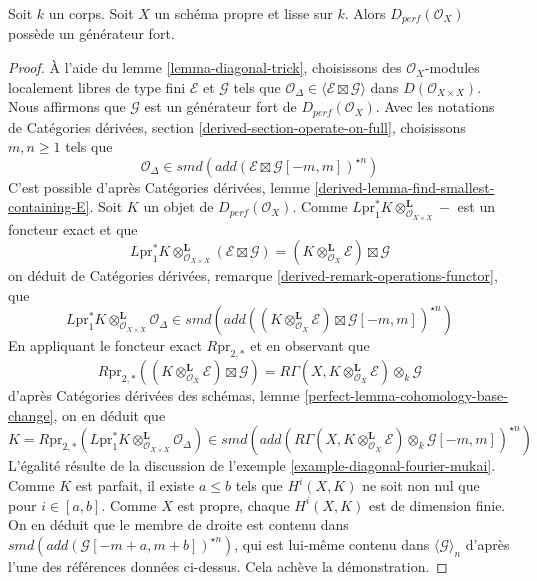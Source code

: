 \begin{lemma}
\label{lemma-smooth-proper-strong-generator}
Soit $k$ un corps. Soit $X$ un schéma propre et lisse sur $k$.
Alors $D_{perf}(\mathcal{O}_X)$
possède un générateur fort.
\end{lemma}

\begin{proof}
À l'aide du lemme \ref{lemma-diagonal-trick}, choisissons des
$\mathcal{O}_X$-modules localement libres de type fini $\mathcal{E}$ et $\mathcal{G}$ tels que
$\mathcal{O}_\Delta \in \langle \mathcal{E} \boxtimes \mathcal{G} \rangle$
dans $D(\mathcal{O}_{X \times X})$. Nous affirmons que $\mathcal{G}$
est un générateur fort de $D_{perf}(\mathcal{O}_X)$. Avec les notations de
Catégories dérivées, section \ref{derived-section-operate-on-full},
choisissons $m, n \geq 1$ tels que
$$
\mathcal{O}_\Delta \in
smd(add(\mathcal{E} \boxtimes \mathcal{G}[-m, m])^{\star n})
$$
C'est possible d'après Catégories dérivées, lemme
\ref{derived-lemma-find-smallest-containing-E}.
Soit $K$ un objet de $D_{perf}(\mathcal{O}_X)$. Comme
$L\text{pr}_1^*K \otimes_{\mathcal{O}_{X \times X}}^\mathbf{L} -$
est un foncteur exact et que
$$
L\text{pr}_1^*K \otimes_{\mathcal{O}_{X \times X}}^\mathbf{L}
(\mathcal{E} \boxtimes \mathcal{G}) =
(K \otimes_{\mathcal{O}_X}^\mathbf{L} \mathcal{E}) \boxtimes \mathcal{G}
$$
on déduit de
Catégories dérivées, remarque \ref{derived-remark-operations-functor}, que
$$
L\text{pr}_1^*K
\otimes_{\mathcal{O}_{X \times X}}^\mathbf{L}
\mathcal{O}_\Delta
\in
smd(add(
(K \otimes_{\mathcal{O}_X}^\mathbf{L} \mathcal{E})
\boxtimes \mathcal{G}[-m, m])^{\star n})
$$
En appliquant le foncteur exact $R\text{pr}_{2, *}$ et en observant que
$$
R\text{pr}_{2, *}
\left((K \otimes_{\mathcal{O}_X}^\mathbf{L} \mathcal{E}) \boxtimes
\mathcal{G}\right) =
R\Gamma(X, K \otimes_{\mathcal{O}_X}^\mathbf{L} \mathcal{E})
\otimes_k \mathcal{G}
$$
d'après Catégories dérivées des schémas, lemme
\ref{perfect-lemma-cohomology-base-change}, on en déduit que
$$
K = R\text{pr}_{2, *}(L\text{pr}_1^*K
\otimes_{\mathcal{O}_{X \times X}}^\mathbf{L} \mathcal{O}_\Delta)
\in
smd(add(R\Gamma(X, K \otimes_{\mathcal{O}_X}^\mathbf{L} \mathcal{E})
\otimes_k \mathcal{G}[-m, m])^{\star n})
$$
L'égalité résulte de la discussion de
l'exemple \ref{example-diagonal-fourier-mukai}.
Comme $K$ est parfait, il existe $a \leq b$ tels que
$H^i(X, K)$ ne soit non nul que pour $i \in [a, b]$. Comme $X$ est propre,
chaque $H^i(X, K)$ est de dimension finie. On en déduit que
le membre de droite est contenu dans
$smd(add(\mathcal{G}[-m + a, m + b])^{\star n})$, qui est
lui-même contenu dans $\langle \mathcal{G} \rangle_n$ d'après l'une des
références données ci-dessus. Cela achève la démonstration.
\end{proof}

